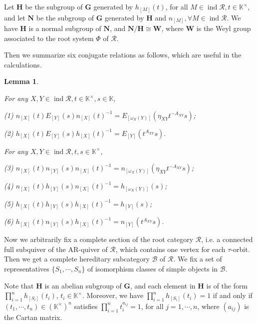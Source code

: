 \documentclass[12pt]{amsart}
\newtheorem{lemma}[theorem]{Lemma}
\begin{document}
Let $\mathbf{H}$ be the subgroup of $\mathbf{G}$ generated by $h_{[M]}(t)$, for all $M \in \operatorname{ind}\mathcal{R}, t \in \mathbb{K}^{\times}$, and let $\mathbf{N}$ be the subgroup of $\mathbf{G}$ generated by $\mathbf{H}$ and $n_{[M]},\forall M \in \operatorname{ind}\mathcal{R}$.
We have $\mathbf{H}$ is a normal subgroup of $\mathbf{N}$, and $\mathbf{N}/\mathbf{H}\cong \mathbf{W}$, where $\mathbf{W}$ is the Weyl group associated to the root system $\Phi$ of $\mathcal{R}$. 


Then we summarize six conjugate relations as follows, which are useful in the calculations.

\begin{lemma}
    \cite[Lemma 4.7-4.12]{notes1} \label{conjugate}

    For any $ X,Y \in \operatorname{ind}\mathcal{R},  t \in \mathbb{K}^{\times}, s \in \mathbb{K}$,

    (1) $ n_{[X]}(t) E_{[Y]}(s) n_{[X]}(t)^{-1} = E_{[\omega_X(Y)]}(\eta_{XY}t^{-A_{XY}}s)$;

    (2) $h_{[X]}(t) E_{[Y]}(s) h_{[X]}(t)^{-1} = E_{[Y]}(t^{A_{XY}}s).$

    For any $X,Y \in \operatorname{ind}\mathcal{R},  t,s \in \mathbb{K}^{\times}$,

    (3) $ n_{[X]}(t) n_{[Y]}(s) n_{[X]}(t)^{-1} = n_{[\omega_X(Y)]}(\eta_{XY}t^{-A_{XY}}s) $;

    (4) $ n_{[X]}(t) h_{[Y]}(s) n_{[X]}(t)^{-1} = h_{[\omega_X(Y)]}(s)$;

    (5) $  h_{[X]}(t) h_{[Y]}(s) h_{[X]}(t)^{-1} = h_{[Y]}(s)$;

    (6) $ h_{[X]}(t) n_{[Y]}(s) h_{[X]}(t)^{-1} = n_{[Y]}(t^{A_{XY}}s).$
\end{lemma}

Now we arbitrarily fix a complete section of the root category $\mathcal{R}$, i.e. a connected full subquiver of the AR-quiver of $\mathcal{R}$, which contains one vertex for each $\tau$-orbit. Then we get a complete hereditary subcategory $\mathcal{B}$ of $\mathcal{R}$.
We fix a set of representatives $\{S_1,\cdots,S_n\}$ of isomorphism classes of simple objects in $\mathcal{B}$.

Note that $\mathbf{H}$ is an abelian subgroup of $\mathbf{G}$, and each element in $\mathbf{H}$ is of the form $\prod\limits_{i=1}^n h_{[S_i]}(t_i)$, $t_i\in \mathbb{K}^{\times}$.
Moreover, we have 
 $ \prod\limits_{i=1}^n h_{[S_i]}(t_i) =1$ if and only if 
       $ (t_1,\cdots,t_n) \in (\mathbb{K}^{\times})^n$ satisfies $\prod\limits_{i=1}^n t_i^{a_{ij}} = 1$, for all $ j=1,\cdots,n$,
    where $(a_{ij})$ is the Cartan matrix.
\end{document}
